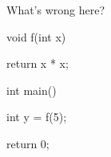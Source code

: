 What's wrong here?



\begin{consolethree}[escapeinside=||]

void f(int x)

{

    return x * x;

}



int main()

{

    int y = f(5);

    return 0;

}

\end{consolethree}

